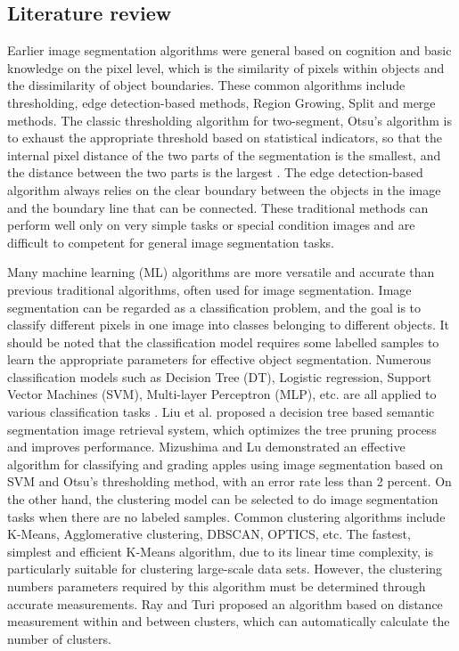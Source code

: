 \documentclass[10pt, a4paper]{article}
\begin{document}
\begin{multicols}{2}
	\section{Literature review} \justify
	Earlier image segmentation algorithms were general based on cognition and basic knowledge on the pixel level, which is the similarity of pixels within objects and the dissimilarity of object boundaries. These common algorithms include thresholding, edge detection-based methods, Region Growing, Split and merge methods. The classic thresholding algorithm for two-segment, Otsu's algorithm is to exhaust the appropriate threshold based on statistical indicators, so that the internal pixel distance of the two parts of the segmentation is the smallest, and the distance between the two parts is the largest \cite{otsu1979threshold}. The edge detection-based algorithm always relies on the clear boundary between the objects in the image and the boundary line that can be connected. These traditional methods can perform well only on very simple tasks or special condition images and are difficult to competent for general image segmentation tasks.
	\par 	
	Many machine learning (ML) algorithms are more versatile and accurate than previous traditional algorithms, often used for image segmentation. Image segmentation can be regarded as a classification problem, and the goal is to classify different pixels in one image into classes belonging to different objects. It should be noted that the classification model requires some labelled samples to learn the appropriate parameters for effective object segmentation. Numerous classification models such as Decision Tree (DT), Logistic regression, Support Vector Machines (SVM), Multi-layer Perceptron (MLP), etc. are all applied to various classification tasks \cite{pedregosa2011scikit}. Liu et al. \cite{liu2006region} proposed a decision tree based semantic segmentation image retrieval system, which optimizes the tree pruning process and improves performance. Mizushima and Lu \cite{mizushima2013image} demonstrated an effective algorithm for classifying and grading apples using image segmentation based on SVM and Otsu’s thresholding method, with an error rate less than 2 percent. On the other hand, the clustering model can be selected to do image segmentation tasks when there are no labeled samples. Common clustering algorithms include K-Means, Agglomerative clustering, DBSCAN, OPTICS, etc. The fastest, simplest and efficient K-Means algorithm, due to its linear time complexity, is particularly suitable for clustering large-scale data sets. However, the clustering numbers parameters required by this algorithm must be determined through accurate measurements. Ray and Turi \cite{ray1999determination} proposed an algorithm based on distance measurement within and between clusters, which can automatically calculate the number of clusters.

\end{multicols}
\end{document}
